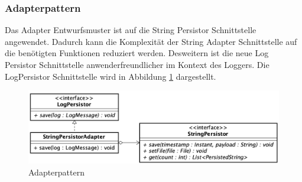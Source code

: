 \subsubsection{Adapterpattern}
Das Adapter Entwurfsmuster ist auf die String Persistor Schnittstelle angewendet. Dadurch kann die Komplexität der String Adapter Schnittstelle auf die benötigten Funktionen reduziert werden. Desweitern ist die neue Log Persistor Schnittstelle anwenderfreundlicher im Kontext des Loggers. Die LogPersistor Schnittstelle wird in Abbildung \ref{fig:Adapterpattern} dargestellt.
\begin{figure}[H]
	\centering
	\includegraphics[width=\textwidth]{2_Architektur/Bilder/adapterpattern.png}
	\caption{Adapterpattern}
	\label{fig:Adapterpattern}
\end{figure}

